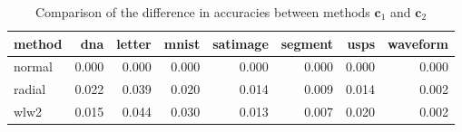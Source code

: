 \begin{table}[ht]
\centering
\begin{tabular}{lrrrrrrr}
  \hline
method & dna & letter & mnist & satimage & segment & usps & waveform \\ 
  \hline
normal & 0.000 & 0.000 & 0.000 & 0.000 & 0.000 & 0.000 & 0.000 \\ 
  radial & 0.022 & 0.039 & 0.020 & 0.014 & 0.009 & 0.014 & 0.002 \\ 
  wlw2 & 0.015 & 0.044 & 0.030 & 0.013 & 0.007 & 0.020 & 0.002 \\ 
   \hline
\end{tabular}
\caption{Comparison of the difference in accuracies between methods $\boldsymbol{c}_1$ and
             $\boldsymbol{c}_2$} 
\label{tab:exp4}
\end{table}
